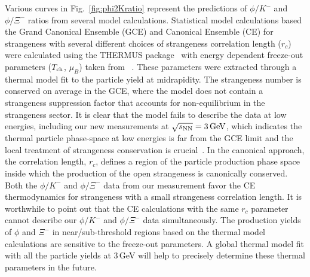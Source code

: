 \documentclass[%
 reprint,	
showpacs,
 amsmath,amssymb,
 aps,
 prc,
]{revtex4-1}
\begin{document}
Various curves in Fig.~\ref{fig:phi2Kratio} represent the predictions of $\phi/K^-$ and $\phi/\Xi^-$ ratios from several model calculations. Statistical model calculations based the Grand Canonical Ensemble (GCE) and Canonical Ensemble (CE) for strangeness with several different choices of strangeness correlation length ($r_c$) were calculated using the THERMUS package~\cite{THERMUS_WHEATON200984} with energy dependent freeze-out parameters ($T_{\rm ch}$, $\mu_B$) taken from ~\cite{Andronic_2018Naure}. These parameters were extracted through a thermal model fit to the particle yield at midrapidity. The strangeness number is conserved on average in the GCE, where the model does not contain a strangeness suppression factor that accounts for non-equilibrium in the strangeness sector. %
It is clear that the model fails to describe the data at low energies, including our new measurements at ${\sqrt{s_{\rm NN}} = \rm{3\,GeV}}$, which indicates the thermal particle phase-space at low energies is far from the GCE limit and the local treatment of strangeness conservation is crucial~\cite{BraunMunzinger:2003zd}. In the canonical approach, the correlation length, $r_c$, defines a region of the particle production phase space inside which the production of the open strangeness is canonically conserved. Both the $\phi/K^-$ and $\phi/\Xi^-$ data from our measurement favor the CE thermodynamics for strangeness with a small strangeness correlation length. It is worthwhile to point out that the CE calculations with the same $r_c$ parameter cannot describe our $\phi/K^-$ and $\phi/\Xi^-$ data simultaneously. The production yields of $\phi$ and $\Xi^-$ in near/sub-threshold regions based on the thermal model calculations are sensitive to the freeze-out parameters. 
A global thermal model fit with all the particle yields at 3\,GeV will help to precisely determine these thermal parameters in the future. %
\end{document}
